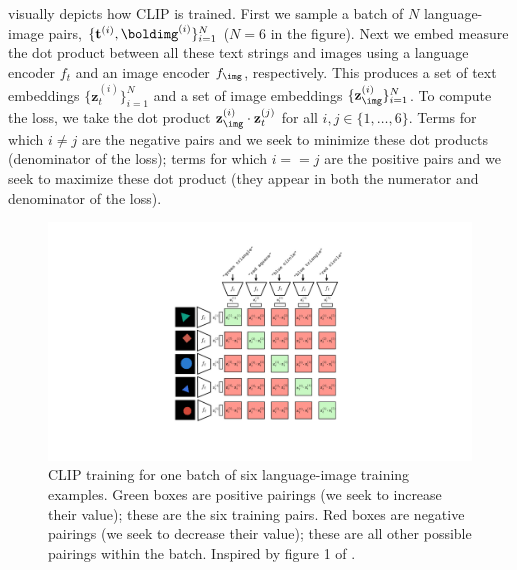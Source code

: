 \Fig{\ref{fig:vision_and_language:clip_training}} visually depicts how CLIP is trained. First we sample a batch of $N$ language-image pairs, $\{\mathbf{t}^{(i)}, \boldimg^{(i)}\}_{i=1}^N$ ($N=6$ in the figure). Next we embed measure the dot product between all these text strings and images using a language encoder $f_t$ and an image encoder $f_\img$, respectively. This produces a set of text embeddings $\{\mathbf{z}^{(i)}_t\}_{i=1}^N$ and a set of image embeddings $\{\mathbf{z}^{(i)}_\img\}_{i=1}^N$. To compute the loss, we take the dot product $\mathbf{z}^{(i)}_\img \cdot \mathbf{z}^{(j)}_t$ for all $i, j \in \{1,\ldots,6\}$. Terms for which $i \neq j$ are the negative pairs and we seek to minimize these dot products (denominator of the loss); terms for which $i == j$ are the positive pairs and we seek to maximize these dot product (they appear in both the numerator and denominator of the loss).
\begin{figure}[h]
\centerline{
    \includegraphics[width=0.85\linewidth]{figures/vision_and_language/clip_training_fig.pdf}
}
\caption{CLIP training for one batch of six language-image training examples. Green boxes are positive pairings (we seek to increase their value); these are the six training pairs. Red boxes are negative pairings (we seek to decrease their value); these are all other possible pairings within the batch. Inspired by figure 1 of \cite{radford2021learning}.}
\label{fig:vision_and_language:clip_training}
\end{figure}

